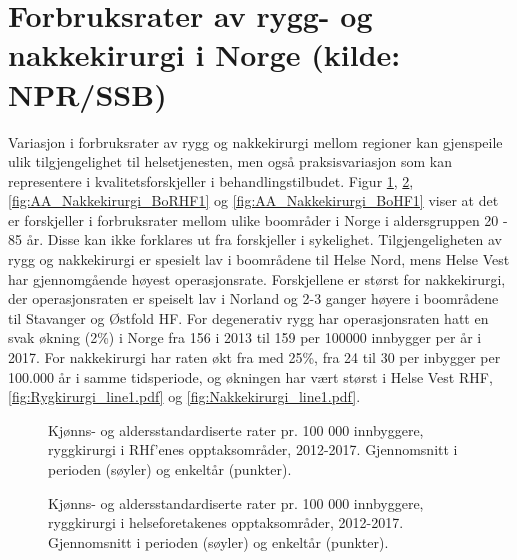\documentclass [norsk,a4paper,twoside]{article}\usepackage[]{graphicx}\usepackage[]{color}
\makeatletter
\newenvironment{kframe}{%
 \def\at@end@of@kframe{}%
 \ifinner\ifhmode%
  \def\at@end@of@kframe{\end{minipage}}%
  \begin{minipage}{\columnwidth}%
 \fi\fi%
 \def\FrameCommand##1{\hskip\@totalleftmargin \hskip-\fboxsep
 \colorbox{shadecolor}{##1}\hskip-\fboxsep
     \hskip-\linewidth \hskip-\@totalleftmargin \hskip\columnwidth}%
 \MakeFramed {\advance\hsize-\width
   \@totalleftmargin\z@ \linewidth\hsize
   \@setminipage}}%
 {\par\unskip\endMakeFramed%
 \at@end@of@kframe}
\newenvironment{knitrout}{}{} %
\makeatother
\begin{document}
\begin{knitrout}
\color{fgcolor}\begin{kframe}


{\ttfamily\noindent\itshape\color{messagecolor}{\#\# The following objects are masked \_by\_ .GlobalEnv:\\\#\# \\\#\#\ \ \ \  ASA, HovedInngrep, UforetrygdPre}}\end{kframe}
\end{knitrout}





\section{Forbruksrater av rygg- og nakkekirurgi i Norge (kilde: NPR/SSB)}
Variasjon i forbruksrater av rygg og nakkekirurgi mellom regioner kan 
gjenspeile ulik tilgjengelighet til helsetjenesten, men også praksisvariasjon som kan
representere i kvalitetsforskjeller i behandlingstilbudet. Figur \ref{fig:AA_Ryggkirurgi_BoRHF1}, \ref{fig:AA_Ryggkirurgi_BoHF1}, \ref{fig:AA_Nakkekirurgi_BoRHF1} og \ref{fig:AA_Nakkekirurgi_BoHF1} viser at det
er forskjeller i forbruksrater mellom ulike boområder i Norge i aldersgruppen 20 - 85 år. Disse kan ikke
forklares ut fra forskjeller i sykelighet. Tilgjengeligheten av rygg og nakkekirurgi er spesielt lav i boområdene til
Helse Nord, mens Helse Vest har gjennomgående høyest operasjonsrate. Forskjellene er størst for nakkekirurgi, der operasjonsraten er speiselt lav i Norland og 2-3 ganger høyere i boområdene til Stavanger og Østfold HF.
For degenerativ rygg har operasjonsraten hatt en svak økning (2\%) i Norge fra 156 i 2013  til 159 per 100000 innbygger per år i 2017. For nakkekirurgi har raten økt fra med 25\%, fra 24 til 30 per inbygger per 100.000 år i samme tidsperiode, og økningen har vært størst i Helse Vest RHF, \ref{fig:Rygkirurgi_line1.pdf} og \ref{fig:Nakkekirurgi_line1.pdf}.
 
\begin{figure}[ht]
\caption{Kjønns- og aldersstandardiserte rater pr. 100 000 innbyggere, ryggkirurgi i RHf’enes opptaksområder, 2012-2017. Gjennomsnitt i perioden (søyler) og enkeltår (punkter).}
\label{fig:AA_Ryggkirurgi_BoRHF1}
\end{figure}

\begin{figure}[ht]
\caption{Kjønns- og aldersstandardiserte rater pr. 100 000 innbyggere, ryggkirurgi i helseforetakenes opptaksområder, 2012-2017. Gjennomsnitt i perioden (søyler) og enkeltår (punkter).}
\label{fig:AA_Ryggkirurgi_BoHF1}
\end{figure}
\end{document}
